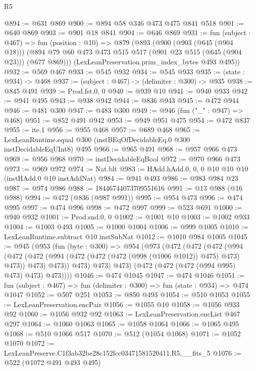 \begin{lexlean}{R5}
\begin{coremodule}
@894 := @631 @869
@900 := @894 @58 @346 @473 @475 @841 @518
@901 := @640 @869
@903 := @901 @18 @841
@904 := @646 @869
@931 := fun (subject : @467) =>
  fun (position : @10) =>
  @879
    (@893
      (@900
        (@903 (@645 (@904 @18)))
        (@894 @79 @60 @473 @473 @515 @517 (@901 @23 @515 (@645 (@904 @23))) (@677 @869)))
      (LexLeanPreservation.prim_index_bytes @493 @495))
@932 := @569 @467
@933 := @545 @932
@934 := @545 @933
@935 := (state : @934) -> @468
@937 := (subject : @467) -> (delimiter : @300) -> @935
@938 := @845 @491
@939 := Prod.fst.{0, 0}
@940 := @939 @10
@941 := @940 @933
@942 := @941 @495
@943 := @938 @942
@944 := @836 @943
@945 := @472 @944
@946 := @481 @300
@947 := @483 @300
@949 := @946 (fun ("_" : @947) => @468)
@951 := @852 @491 @942
@953 := @949 @951 @475
@954 := @472 @837
@955 := ite.{1}
@956 := @955 @468
@957 := @689 @468
@965 := LexLeanRuntime.equal @300 (instBEqOfDecidableEq.{0} @300 instDecidableEqUInt8) @495
@966 := @965 @491
@968 := @957 @966 @473
@969 := @956 @968
@970 := instDecidableEqBool
@972 := @970 @966 @473
@973 := @969 @972
@974 := Nat.blt
@983 := HAdd.hAdd.{0, 0, 0} @10 @10 @10 (instHAdd.{0} @10 instAddNat)
@984 := @941 @493
@986 := @983 @984 @23
@987 := @974 @986
@988 := 18446744073709551616
@991 := @13 @988 (@16 @988)
@994 := @472 (@836 (@987 @991))
@995 := @954 @473
@996 := @474 @995
@997 := @474 @996
@998 := @472 @997
@999 := @523 @691
@1000 := @940 @932
@1001 := Prod.snd.{0, 0}
@1002 := @1001 @10
@1003 := @1002 @933
@1004 := @1003 @493
@1005 := @1000 @1004
@1006 := @999 @1005
@1010 := LexLeanRuntime.subtract @10 instSubNat
@1012 := @1010 @984 @1005
@1045 := @945
    (@953
      (fun (byte : @300) =>
      @954
        (@973
          (@472
            (@472
              (@472
                (@994
                  (@472
                    (@472 (@994 (@472 (@472 (@472 (@998 (@1006 @1012)) @475) @473) @473)) @473)
                    @473))
                @473)
              @473)
            @473)
          (@472 (@472 (@472 (@994 @995) @473) @473) @473))))
@1046 := @474 @1045
@1047 := @474 @1046
@1051 := fun (subject : @467) => fun (delimiter : @300) => fun (state : @934) => @474 @1047
@1052 := @507 @251
@1053 := @850 @493
@1054 := @510 @1053
@1055 := LexLeanPreservation.encPair
@1056 := @1055 @10
@1058 := @1056 @933 @92
@1060 := @1056 @932 @92
@1063 := LexLeanPreservation.encList @467 @297
@1064 := @1060 @1063
@1065 := @1058 @1064
@1066 := @1065 @495
@1068 := @510 @1066 @517
@1070 := @512 (@1054 @1068)
@1071 := @1052 @1070
@1072 := LexLeanPreserve.C1f3ab32be28c152fcc03471581520411.R5.__fits_5
@1076 := @522 (@1072 @491 @493 @495)

\end{coremodule}
\end{lexlean}
